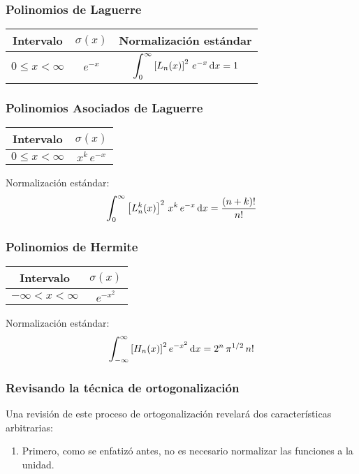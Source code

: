 \documentclass[12pt]{beamer}
\begin{document}
\begin{frame}
\frametitle{Polinomios de Laguerre}
\begingroup
\renewcommand{\arraystretch}{2.5}
\begin{table}
\begin{tabular}{c c c}
Intervalo & $\sigma (x)$ & Normalización estándar \\ \hline
$0 \leq x < \infty $ & $e^{-x}$ & $\displaystyle \scaleint{6ex}_{\bs 0}^{\infty} \left[ L_{n} (x) \right]^{2} \, e^{-x} \dd{x} =  1 $
\end{tabular}
\end{table}
\endgroup
\end{frame}
\begin{frame}
\frametitle{Polinomios Asociados de Laguerre}
\begin{table}
\begin{tabular}{c c}
Intervalo & $\sigma (x)$ \\ \hline
$0 \leq x < \infty $ & $x^{k} \, e^{-x}$ \\ \hline
\end{tabular}
\end{table}
Normalización estándar:
\begin{align*}
\scaleint{6ex}_{\bs 0}^{\infty} \left[ L_{n}^{k} (x) \right]^{2} \, x^{k} \, e^{-x} \dd{x} = \dfrac{(n + k)!}{n!}
\end{align*}
\end{frame}
\begin{frame}
\frametitle{Polinomios de Hermite}
\begin{table}
\begin{tabular}{c c}
Intervalo & $\sigma (x)$ \\ \hline
$- \infty < x < \infty $ & $e^{-x^{2}}$ \\ \hline
\end{tabular}
\end{table}
Normalización estándar:
\begin{align*}
\scaleint{6ex}_{\bs -\infty}^{\infty} \left[ H_{n} (x) \right]^{2} e^{-x^{2}} \dd{x} = 2^{n} \, \pi^{1/2} \, n!
\end{align*}
\end{frame}
\begin{frame}
\frametitle{Revisando la técnica de ortogonalización}
Una revisión de este proceso de ortogonalización revelará dos características arbitrarias:
\pause
{}
\begin{enumerate}
\item Primero, como se enfatizó antes, no es necesario normalizar las funciones a la unidad. 
\seti
\end{enumerate}
\end{frame}
\end{document}

